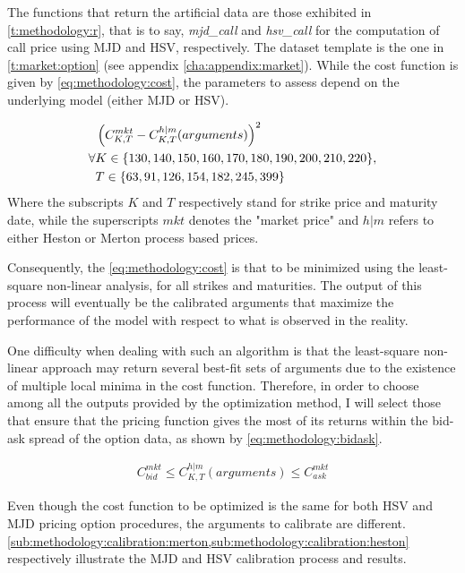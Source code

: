 \documentclass[12pt]{report}
\begin{document}
The functions that return the artificial data are those exhibited in \cref{t:methodology:r}, that is to say, \textit{mjd\_call} and \textit{hsv\_call} for the computation of call price using MJD and HSV, respectively.
The dataset template is the one in \cref{t:market:option} (see appendix \ref{cha:appendix:market}).
While the cost function is given by \cref{eq:methodology:cost}, the parameters to assess depend on the underlying model (either MJD or HSV).

\begin{align}
 &\left(C_{K,T}^{mkt} - C_{K,T}^{h|m}(arguments)\right)^2
 \label{eq:methodology:cost}\\
 \forall &K \in \{130, 140, 150, 160, 170, 180, 190, 200, 210, 220\}, \notag\\
 &T \in \left \{63, 91, 126, 154, 182, 245, 399\right \}\notag 
\end{align}
Where the subscripts $K$ and $T$ respectively stand for strike price and maturity date, while the superscripts $mkt$ denotes the "market price" and $h|m$ refers to either Heston or Merton process based prices.

Consequently, the \cref{eq:methodology:cost} is that to be minimized using the least-square non-linear analysis, for all strikes and maturities.
The output of this process will eventually be the calibrated arguments that maximize the performance of the model with respect to what is observed in the reality.

One difficulty when dealing with such an algorithm is that the least-square non-linear approach may return several best-fit sets of arguments due to the existence of multiple local minima in the cost function.
Therefore, in order to choose among all the outputs provided by the optimization method, I will select those that ensure that the pricing function gives the most of its returns within the bid-ask spread of the option data, as shown by \cref{eq:methodology:bidask}.

\begin{align}
  C_{bid}^{mkt} \leq C_{K,T}^{h|m}(arguments)  \leq C_{ask}^{mkt}
 \label{eq:methodology:bidask}
\end{align}

Even though the cost function to be optimized is the same for both HSV and MJD pricing option procedures, the arguments to calibrate are different. \cref{sub:methodology:calibration:merton,sub:methodology:calibration:heston} respectively illustrate the  MJD and HSV calibration process and results.
\end{document}
